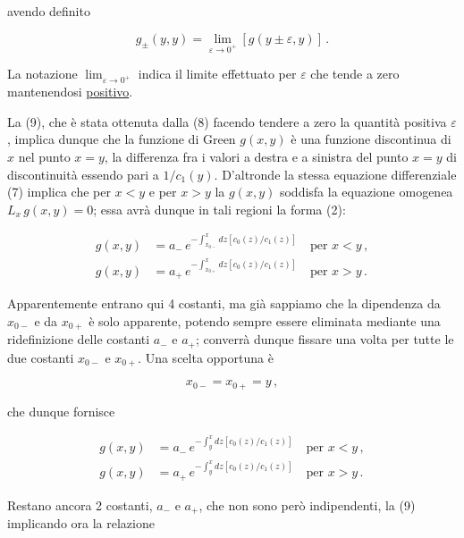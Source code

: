 \documentclass[11pt, a4paper]{book}
\numberwithin{equation}{section}
\begin{document}
avendo definito

\begin{equation}
    g_\pm(y,y) = \lim_{\varepsilon \to 0^+} \left[ g(y \pm \varepsilon, y) \right] \,.
\end{equation}

La notazione $\lim_{\varepsilon\to 0^+}$ indica il limite effettuato per $\varepsilon$ che tende a zero mantenendosi \underline{positivo}.

La (9), che è stata ottenuta dalla (8) facendo tendere a zero la quantità positiva $\varepsilon$, implica dunque che la funzione di Green $g(x,y)$ è una funzione discontinua di $x$ nel punto $x=y$, la differenza fra i valori a destra e a sinistra del punto $x=y$ di discontinuità essendo pari a $1/c_1(y)$. D'altronde la stessa equazione differenziale (7) implica che per $x < y$ e per $x > y$ la $g(x,y)$ soddisfa la equazione omogenea $L_x \, g(x,y) = 0$; essa avrà dunque in tali regioni la forma (2):

\begin{align}
    g(x,y) &= a_- \, e^{\displaystyle -\int_{x_{0-}}^{x} dz \left[ c_0(z)/c_1(z) \right]} \quad \text{per } x < y \,, \tag{11a} \\
    g(x,y) &= a_+ \, e^{\displaystyle -\int_{x_{0+}}^{x} dz \left[ c_0(z)/c_1(z) \right]} \quad \text{per } x > y \,. \tag{11b}
\end{align}

Apparentemente entrano qui 4 costanti, ma già sappiamo che la dipendenza da $x_{0-}$ e da $x_{0+}$ è solo apparente, potendo sempre essere eliminata mediante una ridefinizione delle costanti $a_-$ e $a_+$; converrà dunque fissare una volta per tutte le due costanti $x_{0-}$ e $x_{0+}$. Una scelta opportuna è

\begin{equation}
    x_{0-} = x_{0+} = y \,,
\end{equation}

che dunque fornisce

\begin{align}
    g(x,y) &= a_- \, e^{\displaystyle -\int_{y}^{x} dz \left[ c_0(z)/c_1(z) \right]} \quad \text{per } x < y \,, \tag{13a} \\
    g(x,y) &= a_+ \, e^{\displaystyle -\int_{y}^{x} dz \left[ c_0(z)/c_1(z) \right]} \quad \text{per } x > y \,. \tag{13b}
\end{align}

Restano ancora 2 costanti, $a_-$ e $a_+$, che non sono però indipendenti, la (9) implicando ora la relazione
\end{document}
